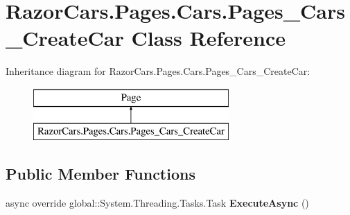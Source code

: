 \hypertarget{class_razor_cars_1_1_pages_1_1_cars_1_1_pages___cars___create_car}{}\section{Razor\+Cars.\+Pages.\+Cars.\+Pages\+\_\+\+Cars\+\_\+\+Create\+Car Class Reference}
\label{class_razor_cars_1_1_pages_1_1_cars_1_1_pages___cars___create_car}
Inheritance diagram for Razor\+Cars.\+Pages.\+Cars.\+Pages\+\_\+\+Cars\+\_\+\+Create\+Car\+:\begin{figure}[H]
\begin{center}
\leavevmode
\includegraphics[height=2.000000cm]{class_razor_cars_1_1_pages_1_1_cars_1_1_pages___cars___create_car}
\end{center}
\end{figure}
\subsection*{Public Member Functions}
\begin{DoxyCompactItemize}
\item 
\mbox{\label{class_razor_cars_1_1_pages_1_1_cars_1_1_pages___cars___create_car_ae4040f994fe125db5abbaace03046aed}} 
async override global\+::\+System.\+Threading.\+Tasks.\+Task {\bfseries Execute\+Async} ()
\end{DoxyCompactItemize}

